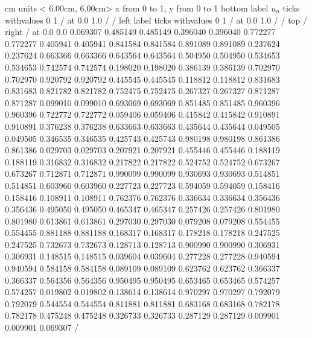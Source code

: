 \begin {center}
 cm  \beginpicture
\setcoordinatesystem units < 6.00cm, 6.00cm>
\setplotarea x from 0 to 1, y from 0 to 1
\axis bottom
  label $u_{n}$
  ticks withvalues        0        1  / at 0.0 1.0 / / 
\axis left
  label 
  ticks withvalues         0        1  / at 0.0 1.0 / / 
\axis top /  \axis right /
 at
   0.0        0.0
   0.069307   0.485149
   0.485149   0.396040
   0.396040   0.772277
   0.772277   0.405941
   0.405941   0.841584
   0.841584   0.891089
   0.891089   0.237624
   0.237624   0.663366
   0.663366   0.643564
   0.643564   0.504950
   0.504950   0.534653
   0.534653   0.742574
   0.742574   0.198020
   0.198020   0.386139
   0.386139   0.702970
   0.702970   0.920792
   0.920792   0.445545
   0.445545   0.118812
   0.118812   0.831683
   0.831683   0.821782
   0.821782   0.752475
   0.752475   0.267327
   0.267327   0.871287
   0.871287   0.099010
   0.099010   0.693069
   0.693069   0.851485
   0.851485   0.960396
   0.960396   0.722772
   0.722772   0.059406
   0.059406   0.415842
   0.415842   0.910891
   0.910891   0.376238
   0.376238   0.633663
   0.633663   0.435644
   0.435644   0.049505
   0.049505   0.346535
   0.346535   0.425743
   0.425743   0.980198
   0.980198   0.861386
   0.861386   0.029703
   0.029703   0.207921
   0.207921   0.455446
   0.455446   0.188119
   0.188119   0.316832
   0.316832   0.217822
   0.217822   0.524752
   0.524752   0.673267
   0.673267   0.712871
   0.712871   0.990099
   0.990099   0.930693
   0.930693   0.514851
   0.514851   0.603960
   0.603960   0.227723
   0.227723   0.594059
   0.594059   0.158416
   0.158416   0.108911
   0.108911   0.762376
   0.762376   0.336634
   0.336634   0.356436
   0.356436   0.495050
   0.495050   0.465347
   0.465347   0.257426
   0.257426   0.801980
   0.801980   0.613861
   0.613861   0.297030
   0.297030   0.079208
   0.079208   0.554455
   0.554455   0.881188
   0.881188   0.168317
   0.168317   0.178218
   0.178218   0.247525
   0.247525   0.732673
   0.732673   0.128713
   0.128713   0.900990
   0.900990   0.306931
   0.306931   0.148515
   0.148515   0.039604
   0.039604   0.277228
   0.277228   0.940594
   0.940594   0.584158
   0.584158   0.089109
   0.089109   0.623762
   0.623762   0.366337
   0.366337   0.564356
   0.564356   0.950495
   0.950495   0.653465
   0.653465   0.574257
   0.574257   0.019802
   0.019802   0.138614
   0.138614   0.970297
   0.970297   0.792079
   0.792079   0.544554
   0.544554   0.811881
   0.811881   0.683168
   0.683168   0.782178
   0.782178   0.475248
   0.475248   0.326733
   0.326733   0.287129
   0.287129   0.009901
   0.009901   0.069307
/ \endpicture
\end {center}

